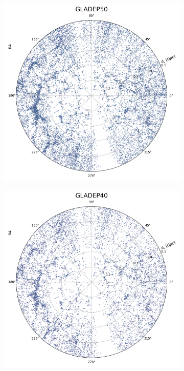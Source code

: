 \begin{figure}[h!]
\begin{subfigure}{0.32\textwidth}
    \label{fig:gladep60}
  \end{subfigure}
  \begin{subfigure}{0.32\textwidth}
    \includegraphics[width=\linewidth]{figures/test_frame_g_5.png}
    \label{fig:gladep50}
  \end{subfigure}
  \vspace{0.5em}
  \begin{subfigure}{0.32\textwidth}
    \includegraphics[width=\linewidth]{figures/test_frame_g_6.png}

\end{subfigure}
\end{figure}
